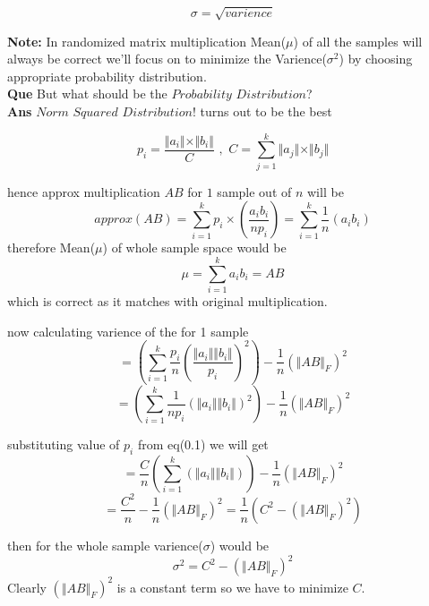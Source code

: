 \documentclass[a4paper]{article}
\numberwithin{equation}{section}
\begin{document}
\begin{itemize}
\[ \sigma=\sqrt{varience}\]

\textbf{Note: }In randomized matrix multiplication Mean($\mu$) of all the samples will always be correct we'll focus on to minimize the Varience($\sigma^2$) by choosing appropriate probability distribution.\\

\textbf{Que} But what should be the $Probability$ $Distribution$?\\
\textbf{Ans} $Norm$ $Squared$ $Distribution!$ turns out to be the best

\begin{equation}
    p_i=\frac{\Vert a_i \Vert \times \Vert b_i \Vert}{C} \hspace{4pt} , \hspace{4pt} C=\sum_{j=1}^{k}\Vert a_j \Vert  \times \Vert b_j \Vert
\end{equation}

hence approx multiplication $AB$ for $1$ sample out of $n$ will be
\[approx(AB)=\sum_{i=1}^{k}p_i \times \left(\frac{a_ib_i}{np_i}\right)=\sum_{i=1}^{k}\frac{1}{n}\left(a_ib_i\right)\]
therefore Mean($\mu$) of whole sample space would be
\[\mu=\sum_{i=1}^{k}a_ib_i=AB\]
which is correct as it matches with original multiplication.

now calculating varience of the for 1 sample
\[=\left(\sum_{i=1}^{k}\frac{p_i}{n}\left(\frac{\Vert a_i\Vert \Vert b_i\Vert}{p_i}\right)^2\right)-\frac{1}{n}\left(\Vert AB\Vert_F\right)^2\]
\[=\left(\sum_{i=1}^{k}\frac{1}{np_i}\left({\Vert a_i\Vert \Vert b_i\Vert}\right)^2\right)-\frac{1}{n}\left(\Vert AB\Vert_F\right)^2\]

substituting value of $p_i$ from eq(0.1) we will get
\[=\frac{C}{n}\left(\sum_{i=1}^{k}\left({\Vert a_i\Vert \Vert b_i\Vert}\right)\right)-\frac{1}{n}\left(\Vert AB\Vert_F\right)^2\]
\[=\frac{C^2}{n}-\frac{1}{n}\left(\Vert AB\Vert_F\right)^2=\frac{1}{n}\left(C^2-\left(\Vert AB\Vert_F\right)^2\right)\]




then for the whole sample varience($\sigma$) would be 
\[\sigma^2=C^2-\left(\Vert AB\Vert_F\right)^2\]
Clearly $\left(\Vert AB\Vert_F\right)^2$ is a constant term so we have to minimize $C$.


\end{itemize}
\end{document}
